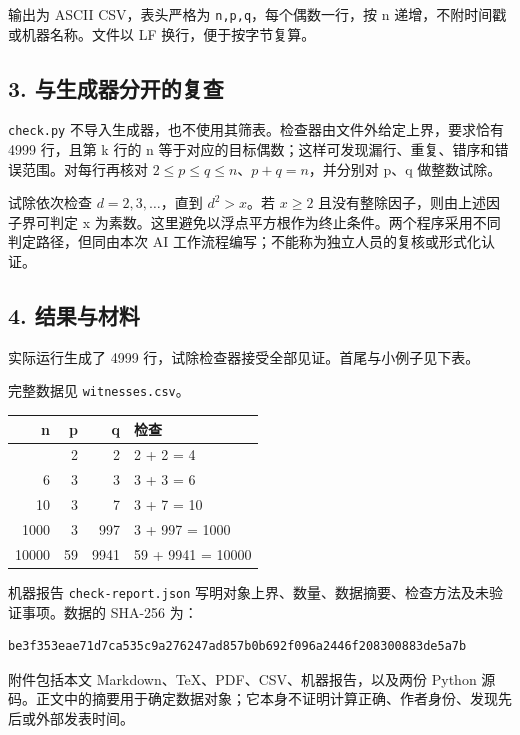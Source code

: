 \documentclass[
  11pt,
  fontset=fandol]{ctexart}
\newcounter{none} %
\begin{document}
输出为 ASCII CSV，表头严格为 \texttt{n,p,q}，每个偶数一行，按 n
递增，不附时间戳或机器名称。文件以 LF 换行，便于按字节复算。

\subsection{3.
与生成器分开的复查}\label{ux4e0eux751fux6210ux5668ux5206ux5f00ux7684ux590dux67e5}

\texttt{check.py}
不导入生成器，也不使用其筛表。检查器由文件外给定上界，要求恰有 4999
行，且第 k 行的 n
等于对应的目标偶数；这样可发现漏行、重复、错序和错误范围。对每行再核对
\(2\leq p\leq q\leq n\)、\(p+q=n\)，并分别对 p、q 做整数试除。

试除依次检查 \(d=2,3,\ldots\)，直到 \(d^2>x\)。若 \(x\geq2\)
且没有整除因子，则由上述因子界可判定 x
为素数。这里避免以浮点平方根作为终止条件。两个程序采用不同判定路径，但同由本次
AI 工作流程编写；不能称为独立人员的复核或形式化认证。

\subsection{4. 结果与材料}\label{ux7ed3ux679cux4e0eux6750ux6599}

实际运行生成了 4999 行，试除检查器接受全部见证。首尾与小例子见下表。

完整数据见 \texttt{witnesses.csv}。

{\def\LTcaptype{none} %
\begin{longtable}[]{@{}rrrl@{}}
\toprule\noalign{}
n & p & q & 检查 \\
\midrule\noalign{}
\endhead
\bottomrule\noalign{}
\endlastfoot
4 & 2 & 2 & 2 + 2 = 4 \\
6 & 3 & 3 & 3 + 3 = 6 \\
10 & 3 & 7 & 3 + 7 = 10 \\
1000 & 3 & 997 & 3 + 997 = 1000 \\
10000 & 59 & 9941 & 59 + 9941 = 10000 \\
\end{longtable}
}

机器报告 \texttt{check-report.json}
写明对象上界、数量、数据摘要、检查方法及未验证事项。数据的 SHA-256 为：

\begin{verbatim}
be3f353eae71d7ca535c9a276247ad857b0b692f096a2446f208300883de5a7b
\end{verbatim}

附件包括本文 Markdown、TeX、PDF、CSV、机器报告，以及两份 Python
源码。正文中的摘要用于确定数据对象；它本身不证明计算正确、作者身份、发现先后或外部发表时间。
\end{document}
